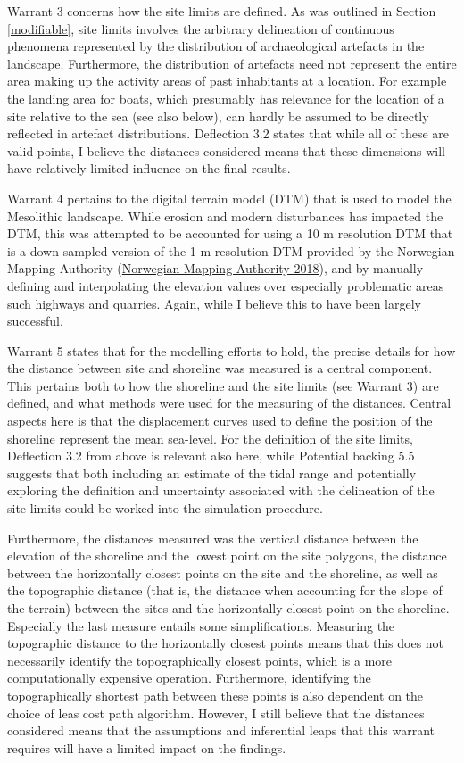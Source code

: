 \documentclass[
  12pt,
  a4paper,
  oneside]{book}
\begin{document}
Warrant 3 concerns how the site limits are defined. As was outlined in Section \ref{modifiable}, site limits involves the arbitrary delineation of continuous phenomena represented by the distribution of archaeological artefacts in the landscape. Furthermore, the distribution of artefacts need not represent the entire area making up the activity areas of past inhabitants at a location. For example the landing area for boats, which presumably has relevance for the location of a site relative to the sea (see also below), can hardly be assumed to be directly reflected in artefact distributions. Deflection 3.2 states that while all of these are valid points, I believe the distances considered means that these dimensions will have relatively limited influence on the final results.

Warrant 4 pertains to the digital terrain model (DTM) that is used to model the Mesolithic landscape. While erosion and modern disturbances has impacted the DTM, this was attempted to be accounted for using a 10 m resolution DTM that is a down-sampled version of the 1 m resolution DTM provided by the Norwegian Mapping Authority (\protect\hyperlink{ref-mapping2018}{Norwegian Mapping Authority 2018}), and by manually defining and interpolating the elevation values over especially problematic areas such highways and quarries. Again, while I believe this to have been largely successful.

Warrant 5 states that for the modelling efforts to hold, the precise details for how the distance between site and shoreline was measured is a central component. This pertains both to how the shoreline and the site limits (see Warrant 3) are defined, and what methods were used for the measuring of the distances. Central aspects here is that the displacement curves used to define the position of the shoreline represent the mean sea-level. For the definition of the site limits, Deflection 3.2 from above is relevant also here, while Potential backing 5.5 suggests that both including an estimate of the tidal range and potentially exploring the definition and uncertainty associated with the delineation of the site limits could be worked into the simulation procedure.

Furthermore, the distances measured was the vertical distance between the elevation of the shoreline and the lowest point on the site polygons, the distance between the horizontally closest points on the site and the shoreline, as well as the topographic distance (that is, the distance when accounting for the slope of the terrain) between the sites and the horizontally closest point on the shoreline. Especially the last measure entails some simplifications. Measuring the topographic distance to the horizontally closest points means that this does not necessarily identify the topographically closest points, which is a more computationally expensive operation. Furthermore, identifying the topographically shortest path between these points is also dependent on the choice of leas cost path algorithm. However, I still believe that the distances considered means that the assumptions and inferential leaps that this warrant requires will have a limited impact on the findings.
\end{document}
